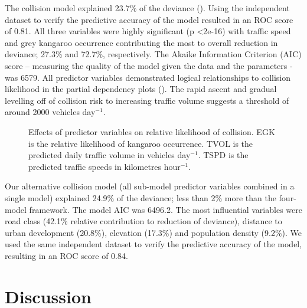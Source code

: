 The collision model explained 23.7\% of the deviance (). Using the independent dataset to verify the predictive accuracy of the model resulted in an ROC score of 0.81.  All three variables were highly significant (p \textless 2e-16) with traffic speed and grey kangaroo occurrence contributing the most to overall reduction in deviance; 27.3\% and 72.7\%, respectively.  The Akaike Information Criterion (AIC) score – measuring the quality of the model given the data and the parameters - was 6579.  All predictor variables demonstrated logical relationships to collision likelihood in the partial dependency plots (). The rapid ascent and gradual levelling off of collision risk to increasing traffic volume suggests a threshold of around 2000 vehicles day$^{-1}$.

\begin{figure*}[htp]
  \centering
  \caption[Effects of predictor variables on relative likelihood of collision]{Effects of predictor variables on relative likelihood of collision. EGK is the relative likelihood of kangaroo occurrence. TVOL is the predicted daily traffic volume in vehicles day$^{-1}$. TSPD is the predicted traffic speeds in kilometres hour$^{-1}$.}
  \label{egk_effects}
\end{figure*}

Our alternative collision model (all sub-model predictor variables combined in a single model) explained 24.9\% of the deviance; less than 2\% more than the four-model framework.  The model AIC was 6496.2. The most influential variables were road class (42.1\% relative contribution to reduction of deviance), distance to urban development (20.8\%), elevation (17.3\%) and population density (9.2\%). We used the same independent dataset to verify the predictive accuracy of the model, resulting in an ROC score of 0.84.

\section{Discussion}

